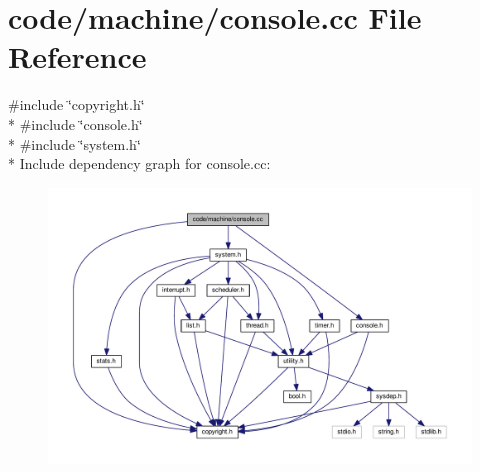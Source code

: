 \section{code/machine/console.cc File Reference}
\label{console_8cc}
{\ttfamily \#include \char`\"{}copyright.\+h\char`\"{}}\\*
{\ttfamily \#include \char`\"{}console.\+h\char`\"{}}\\*
{\ttfamily \#include \char`\"{}system.\+h\char`\"{}}\\*
Include dependency graph for console.\+cc\+:
\nopagebreak
\begin{figure}[H]
\begin{center}
\leavevmode
\includegraphics[width=350pt]{console_8cc__incl}
\end{center}
\end{figure}
